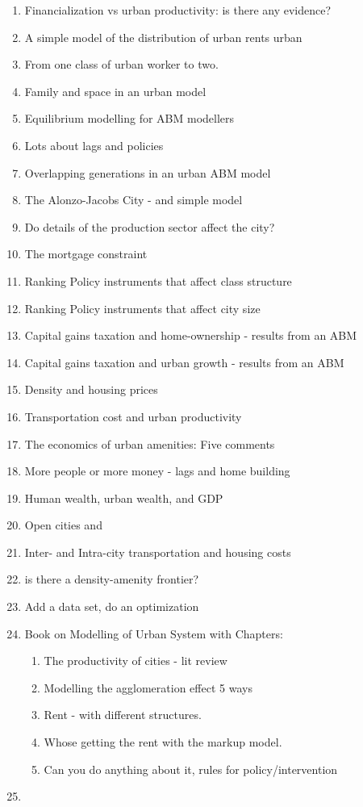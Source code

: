 \documentclass[]{article}
\begin{document}
\begin{enumerate}
    \item Financialization vs urban productivity: is there any evidence?
    \item A simple model of the distribution of urban rents urban 
    \item From one class of urban worker to two.
    \item Family and space in an urban model
    \item Equilibrium modelling for ABM modellers 
    \item Lots about lags and policies
    \item Overlapping generations in an urban ABM model 
    \item The Alonzo-Jacobs City - and simple model
    \item Do details of the production sector affect the city?
    \item The mortgage constraint
    \item Ranking Policy instruments that affect class structure
    \item Ranking Policy instruments that affect city size 
    \item Capital gains taxation and home-ownership - results from an ABM
    \item Capital gains taxation and urban growth - results from an ABM
    \item Density and housing prices
    \item Transportation cost and urban productivity
    \item The economics of urban amenities: Five comments
    \item More people or more money - lags and home building 
    \item Human wealth, urban wealth, and GDP
    \item Open cities and 
    \item Inter- and Intra-city transportation and housing costs
    \item is there a density-amenity frontier?
    \item Add a data set, do an optimization
    \item Book on  Modelling of Urban System with Chapters:
    \begin{enumerate}
        \item The productivity of cities - lit review 
        \item  Modelling the agglomeration effect 5 ways
        \item  Rent - with different structures.
        \item  Whose getting the rent with the markup model.
        \item  Can  you do anything about it, rules for policy/intervention
    \end{enumerate}  

    \item 
    \end{enumerate}  
\end{document}
